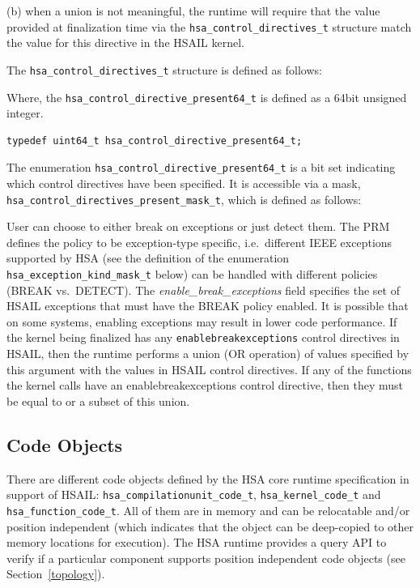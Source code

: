 \documentclass{book}
\begin{document}
\begin{appendices}
(b) when a union is not meaningful, the runtime will require that the value provided at
finalization time via the \texttt{hsa\_control\_directives\_t}
structure match the value for this directive in the HSAIL kernel.

The \texttt{hsa\_control\_directives\_t} structure is defined as
follows:



Where, the \texttt{hsa\_control\_directive\_present64\_t} is defined
as a 64bit unsigned integer.

\begin{lstlisting}
typedef uint64_t hsa_control_directive_present64_t;
\end{lstlisting}

The enumeration \texttt{hsa\_control\_directive\_present64\_t} is a
bit set indicating which control directives have been specified. It
is accessible via a mask,
\texttt{hsa\_control\_directives\_present\_mask\_t}, which
is defined as follows:



User can choose to either break on exceptions or just detect them.
The PRM defines the policy to be exception-type specific, i.e.\ different
IEEE exceptions supported by HSA (see the definition of the
enumeration \texttt{hsa\_exception\_kind\_mask\_t} below)  can be
handled with different policies (BREAK vs.\ DETECT).
The {\itshape enable\_break\_exceptions} field specifies the set of
HSAIL exceptions that must have the BREAK policy enabled. It is
possible that on some systems, enabling exceptions may result in
lower code performance.
If the kernel being finalized has any \texttt{enablebreakexceptions}
control directives in HSAIL, then the runtime performs a union (OR
operation) of values specified by this argument with the values in
HSAIL control directives. If any of the functions the kernel calls
have an enablebreakexceptions control directive, then they must be
equal to or a subset of this union.



\subsection{Code Objects}\label{finalize:codeobject}

There are different code objects defined by the HSA core runtime
specification in support of HSAIL:
\texttt{hsa\_compilationunit\_code\_t},
\texttt{hsa\_kernel\_code\_t} and \texttt{hsa\_function\_code\_t}.
All of them are in memory and can be relocatable and/or position
independent (which indicates that the object can be deep-copied to
other memory locations for execution). The HSA runtime provides a
query API to verify if a particular component supports position
independent code objects (see Section~\ref{topology}).


\end{appendices}
\end{document}
